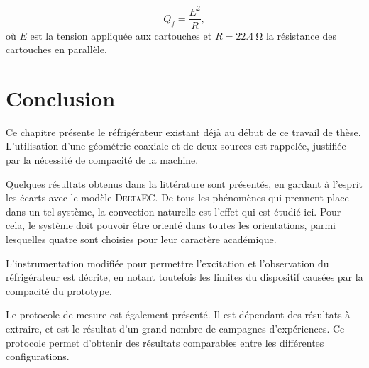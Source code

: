 \begin{equation}
	Q_f = \frac{E^2}{R},
	\label{eq:Qf_définitionEsurR}
\end{equation}
où $E$ est la tension appliquée aux cartouches et $R=\qty{22.4}{\ohm}$ la résistance des cartouches en parallèle. 

\section{Conclusion}
Ce chapitre présente le réfrigérateur existant déjà au début de ce travail de thèse. L'utilisation d'une géométrie coaxiale et de deux sources est rappelée, justifiée par la nécessité de compacité de la machine.

Quelques résultats obtenus dans la littérature sont présentés, en gardant à l'esprit les écarts avec le modèle \textsc{DeltaEC}. De tous les phénomènes qui prennent place dans un tel système, la convection naturelle est l'effet qui est étudié ici. Pour cela, le système doit pouvoir être orienté dans toutes les orientations, parmi lesquelles quatre sont choisies pour leur caractère académique.

L'instrumentation modifiée pour permettre l'excitation et l'observation du réfrigérateur est décrite, en notant toutefois les limites du dispositif causées par la compacité du prototype.

Le protocole de mesure est également présenté. Il est dépendant des résultats à extraire, et est le résultat d'un grand nombre de campagnes d'expériences. Ce protocole permet d'obtenir des résultats comparables entre les différentes configurations.




